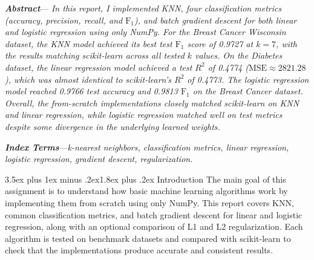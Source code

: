 \documentclass[10pt,twocolumn,letterpaper]{article}
\makeatletter
\renewcommand\section{\@startsection{section}{1}{\z@}%
  {3.5ex plus 1ex minus .2ex}{1.8ex plus .2ex}%
  {\centering\normalfont\normalsize\scshape}}
\makeatother
\begin{document}

\noindent\textbf{\textit{Abstract}}---\textit{%
In this report, I implemented KNN, four classification metrics (accuracy, precision, recall, and $\text{F}_1$), and batch gradient descent for both linear and logistic regression using only NumPy. For the Breast Cancer Wisconsin dataset, the KNN model achieved its best test $\text{F}_1$ score of 0.9727 at $k = 7$, with the results matching scikit-learn across all tested $k$ values. On the Diabetes dataset, the linear regression model achieved a test $R^2$ of 0.4774 ($\text{MSE} \approx 2821.28$), which was almost identical to scikit-learn's $R^2$ of 0.4773. The logistic regression model reached 0.9766 test accuracy and 0.9813 $\text{F}_1$ on the Breast Cancer dataset. Overall, the from-scratch implementations closely matched scikit-learn on KNN and linear regression, while logistic regression matched well on test metrics despite some divergence in the underlying learned weights.
}

\vspace{0.6em}
\noindent\textbf{\textit{Index Terms}}---\textit{k-nearest neighbors,
classification metrics, linear regression, logistic regression,
gradient descent, regularization.}

\vspace{0.8em}

\section{Introduction}
The main goal of this assignment is to understand how basic machine learning algorithms work by implementing them from scratch using only NumPy. This report covers KNN, common classification metrics, and batch gradient descent for linear and logistic regression, along with an optional comparison of L1 and L2 regularization. Each algorithm is tested on benchmark datasets and compared with scikit-learn to check that the implementations produce accurate and consistent results.
\end{document}
